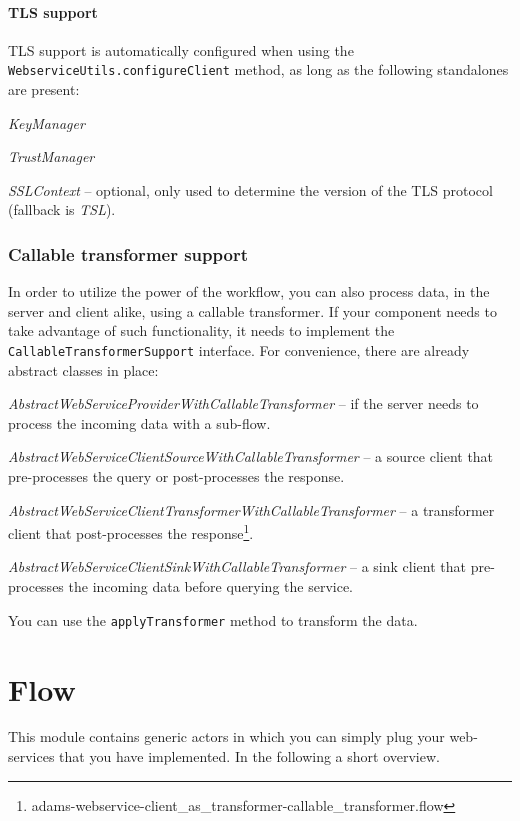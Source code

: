 \documentclass[a4paper]{book}
\begin{document}
\subsubsection{TLS support}
TLS support is automatically configured when using the \verb|WebserviceUtils.configureClient|
method, as long as the following standalones are present:
\begin{tight_itemize}
  \item \textit{KeyManager}
  \item \textit{TrustManager}
  \item \textit{SSLContext} -- optional, only used to determine the version of the
  TLS protocol (fallback is \textit{TSL}).
\begin{tight_itemize}

\subsection{Callable transformer support}
\label{webservice_callable_transformer}
In order to utilize the power of the workflow, you can also process data,
in the server and client alike, using a callable transformer.
If your component needs to take advantage of such functionality, it needs to
implement the \texttt{CallableTransformerSupport} interface. For convenience,
there are already abstract classes in place:
\begin{tight_itemize}
	\item \textit{AbstractWebServiceProviderWithCallableTransformer} -- if the server needs
	to process the incoming data with a sub-flow.
	\item \textit{AbstractWebServiceClientSourceWithCallableTransformer} -- a 
	source client that pre-processes the query or post-processes the response.
	\item \textit{AbstractWebServiceClientTransformerWithCallableTransformer} --
	a transformer client that post-processes the 
	response\footnote{adams-webservice-client\_as\_transformer-callable\_transformer.flow}.
	\item \textit{AbstractWebServiceClientSinkWithCallableTransformer} -- a
	sink client that pre-processes the incoming data before querying the service.
\end{tight_itemize}
You can use the \texttt{applyTransformer} method to transform the data.

\chapter{Flow}
This module contains generic actors in which you can simply plug your 
web-services that you have implemented. In the following a short overview.


\end{tight_itemize}
\end{tight_itemize}
\end{document}
